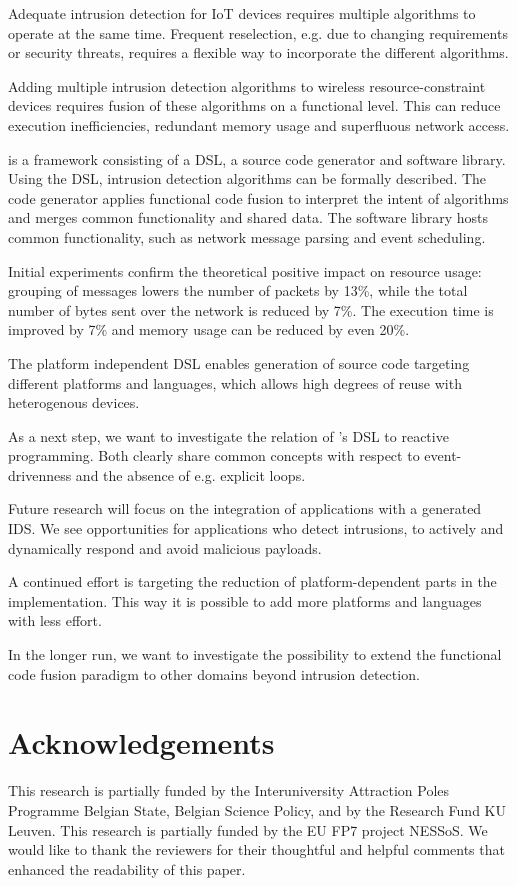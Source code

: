 \documentclass[conference]{IEEEtran}
\begin{document}
Adequate intrusion detection for IoT devices requires multiple algorithms to
operate at the same time. Frequent reselection, e.g. due to changing
requirements or security threats, requires a flexible way to incorporate the
different algorithms.

Adding multiple intrusion detection algorithms to wireless resource-constraint
devices requires fusion of these algorithms on a functional level. This can
reduce execution inefficiencies, redundant memory usage and superfluous network
access.

\NAME is a framework consisting of a DSL, a source code generator and software
library. Using the DSL, intrusion detection algorithms can be formally
described. The code generator applies functional code fusion to interpret the
intent of algorithms and merges common functionality and shared data. The
software library hosts common functionality, such as network message parsing
and event scheduling.

Initial experiments confirm the theoretical positive impact on resource usage:
grouping of messages lowers the number of packets by 13\%, while the total
number of bytes sent over the network is reduced by 7\%. The execution time is
improved by 7\% and memory usage can be reduced by even 20\%.

The platform independent DSL enables generation of source code targeting
different platforms and languages, which allows high degrees of reuse with
heterogenous devices.

As a next step, we want to investigate the relation of \NAME's DSL to reactive
programming. Both clearly share common concepts with respect to
event-drivenness and the absence of e.g. explicit loops.

Future research will focus on the integration of applications with a generated
IDS. We see opportunities for applications who detect intrusions, to actively
and dynamically respond and avoid malicious payloads.

A continued effort is targeting the reduction of platform-dependent parts in
the implementation. This way it is possible to add more platforms and languages
with less effort.

In the longer run, we want to investigate the possibility to extend the
functional code fusion paradigm to other domains beyond intrusion detection.

\section{Acknowledgements}

This research is partially funded by the Interuniversity Attraction Poles
Programme Belgian State, Belgian Science Policy, and by the Research Fund KU
Leuven. This research is partially funded by the EU FP7 project NESSoS\@. We
would like to thank the reviewers for their thoughtful and helpful comments
that enhanced the readability of this paper.



\end{document}
